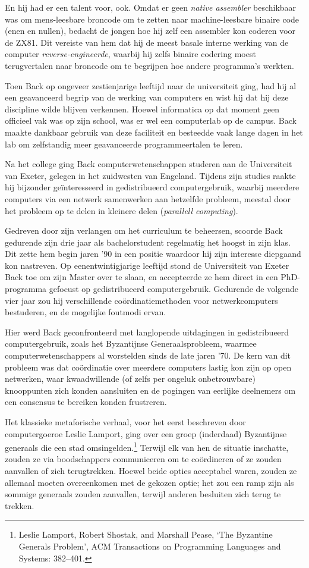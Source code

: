 \documentclass[smalldemyvopaper,11pt,twoside,onecolumn,openright,extrafontsizes,hidelinks]{memoir}
\begin{document}
En hij had er een talent voor, ook. Omdat er geen \emph{native
assembler} beschikbaar was om mens-leesbare broncode om te zetten naar
machine-leesbare binaire code (enen en nullen), bedacht de jongen hoe
hij zelf een assembler kon coderen voor de ZX81. Dit vereiste van hem
dat hij de meest basale interne werking van de computer
\emph{reverse-engineerde}, waarbij hij zelfs binaire codering moest
terugvertalen naar broncode om te begrijpen hoe andere programma's
werkten.

Toen Back op ongeveer zestienjarige leeftijd naar de universiteit ging,
had hij al een geavanceerd begrip van de werking van computers en wist
hij dat hij deze discipline wilde blijven verkennen. Hoewel informatica
op dat moment geen officieel vak was op zijn school, was er wel een
computerlab op de campus. Back maakte dankbaar gebruik van deze
faciliteit en besteedde vaak lange dagen in het lab om zelfstandig meer
geavanceerde programmeertalen te leren.

Na het college ging Back computerwetenschappen studeren aan de
Universiteit van Exeter, gelegen in het zuidwesten van Engeland. Tijdens
zijn studies raakte hij bijzonder geïnteresseerd in gedistribueerd
computergebruik, waarbij meerdere computers via een netwerk samenwerken
aan hetzelfde probleem, meestal door het probleem op te delen in
kleinere delen (\emph{parallell computing}).

Gedreven door zijn verlangen om het curriculum te beheersen, scoorde
Back gedurende zijn drie jaar als bachelorstudent regelmatig het hoogst
in zijn klas. Dit zette hem begin jaren '90 in een positie waardoor hij
zijn interesse diepgaand kon nastreven. Op eenentwintigjarige leeftijd
stond de Universiteit van Exeter Back toe om zijn Master over te slaan,
en accepteerde ze hem direct in een PhD-programma gefocust op
gedistribueerd computergebruik. Gedurende de volgende vier jaar zou hij
verschillende coördinatiemethoden voor netwerkcomputers bestuderen, en
de mogelijke foutmodi ervan.

Hier werd Back geconfronteerd met langlopende uitdagingen in
gedistribueerd computergebruik, zoals het Byzantijnse Generaalsprobleem,
waarmee computerwetenschappers al worstelden sinds de late jaren '70. De
kern van dit probleem was dat coördinatie over meerdere computers lastig
kon zijn op open netwerken, waar kwaadwillende (of zelfs per ongeluk
onbetrouwbare) knooppunten zich konden aansluiten en de pogingen van
eerlijke deelnemers om een consensus te bereiken konden frustreren.

Het klassieke metaforische verhaal, voor het eerst beschreven door
computergoeroe Leslie Lamport, ging over een groep (inderdaad)
Byzantijnse generaals die een stad omsingelden.\footnote{Leslie Lamport,
  Robert Shostak, and Marshall Pease, `The Byzantine Generals Problem',
  ACM Transactions on Programming Languages and Systems: 382--401.}
Terwijl elk van hen de situatie inschatte, zouden ze via boodschappers
communiceren om te coördineren of ze zouden aanvallen of zich
terugtrekken. Hoewel beide opties acceptabel waren, zouden ze allemaal
moeten overeenkomen met de gekozen optie; het zou een ramp zijn als
sommige generaals zouden aanvallen, terwijl anderen besluiten zich terug
te trekken.
\end{document}
